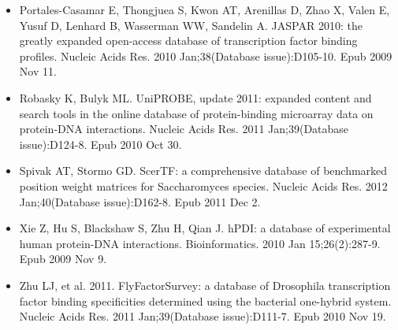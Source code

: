 \documentclass{article}
\begin{document}
\begin{itemize}

\item Portales-Casamar E, Thongjuea S, Kwon AT, Arenillas D, Zhao X, Valen E, Yusuf D, Lenhard B, Wasserman WW, Sandelin A. JASPAR 2010: the greatly expanded open-access database of transcription factor binding profiles. Nucleic Acids Res. 2010 Jan;38(Database issue):D105-10. Epub 2009 Nov 11.

\item Robasky K, Bulyk ML. UniPROBE, update 2011: expanded content and search tools in the online database of protein-binding microarray data on protein-DNA interactions. Nucleic Acids Res. 2011 Jan;39(Database issue):D124-8. Epub 2010 Oct 30.

\item Spivak AT, Stormo GD. ScerTF: a comprehensive database of benchmarked position weight matrices for Saccharomyces species. Nucleic Acids Res. 2012 Jan;40(Database issue):D162-8. Epub 2011 Dec 2.

\item Xie Z, Hu S, Blackshaw S, Zhu H, Qian J. hPDI: a database of experimental human protein-DNA interactions. Bioinformatics. 2010 Jan 15;26(2):287-9. Epub 2009 Nov 9.

\item Zhu LJ, et al. 2011. FlyFactorSurvey: a database of Drosophila transcription factor binding specificities determined using the bacterial one-hybrid system. Nucleic Acids Res. 2011 Jan;39(Database issue):D111-7. Epub 2010 Nov 19.


\end{itemize}
\end{document}
